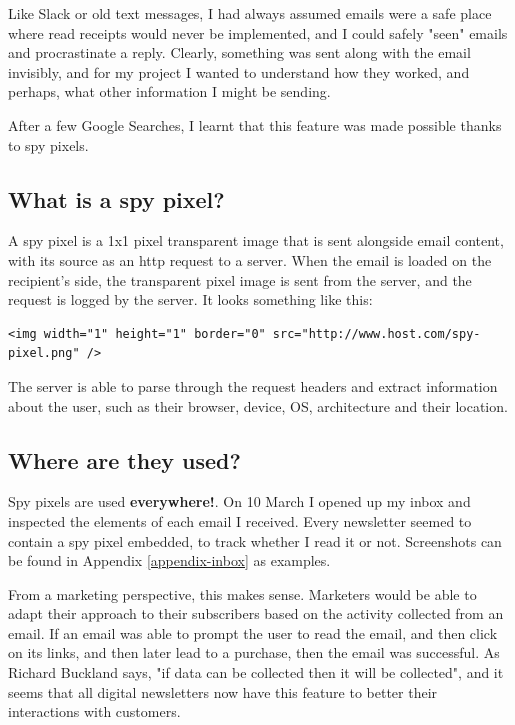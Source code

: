 \documentclass{article}
\begin{document}
Like Slack or old text messages, I had always assumed emails were a safe place where read receipts would never be implemented, and I could safely "seen" emails and procrastinate a reply. Clearly, something was sent along with the email invisibly, and for my project I wanted to understand how they worked, and perhaps, what other information I might be sending.

After a few Google Searches, I learnt that this feature was made possible thanks to spy pixels.

\subsection{What is a spy pixel?}

A spy pixel is a 1x1 pixel transparent image that is sent alongside email content, with its source as an http request to a server. When the email is loaded on the recipient's side, the transparent pixel image is sent from the server, and the request is logged by the server. It looks something like this:
\begin{lstlisting}
<img width="1" height="1" border="0" src="http://www.host.com/spy-pixel.png" />
\end{lstlisting}

The server is able to parse through the request headers and extract information about the user, such as their browser, device, OS, architecture and their location.

\subsection{Where are they used?}

Spy pixels are used \textbf{everywhere!}. On 10 March I opened up my inbox and inspected the elements of each email I received. Every newsletter seemed to contain a spy pixel embedded, to track whether I read it or not. Screenshots can be found in Appendix \ref{appendix-inbox} as examples.

From a marketing perspective, this makes sense. Marketers would be able to adapt their approach to their subscribers based on the activity collected from an email. If an email was able to prompt the user to read the email, and then click on its links, and then later lead to a purchase, then the email was successful. As Richard Buckland says, "if data can be collected then it will be collected", and it seems that all digital newsletters now have this feature to better their interactions with customers.
\end{document}
